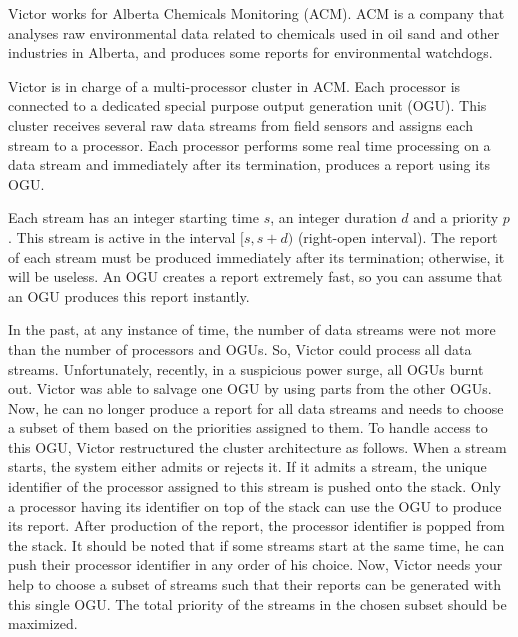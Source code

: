\newcommand{\maxstreams}{5000}
\newcommand{\maxsd}{10^9}
\newcommand{\maxpriority}{100,000}


\setlength{\columnsep}{15pt}
%
Victor works for Alberta Chemicals Monitoring (ACM). ACM is a company that analyses raw environmental data related to chemicals used in oil sand and other industries in Alberta, and produces some reports for environmental watchdogs. 

Victor is in charge of a multi-processor cluster in ACM. Each processor is connected to a dedicated special purpose output generation unit (OGU). This cluster receives several raw data streams from field sensors and assigns each stream to a processor. Each processor performs some real time processing on a data stream and immediately after its termination, produces a report using its OGU.

Each stream has an integer starting time $s$, an integer duration $d$ and a priority $p$. This stream is active in the interval $[s, s+d)$ (right-open interval). The report of each stream must be produced immediately after its termination; otherwise, it will be useless. An OGU creates a report extremely fast, so you can assume that an OGU produces this report instantly. 

In the past, at any instance of time, the number of data streams were not more than the number of processors and OGUs. So, Victor could process all data streams. Unfortunately, recently, in a suspicious power surge, all OGUs burnt out. Victor was able to salvage one OGU by using parts from the other OGUs. Now, he can no longer produce a report for all data streams and needs to choose a subset of them based on the priorities assigned to them. To handle access to this OGU, Victor restructured the cluster architecture as follows. When a stream starts, the system either admits or rejects it. If it admits a stream, the unique identifier of the processor assigned to this stream is pushed onto the stack. Only a processor having its identifier on top of the stack can use the OGU to produce its report. After production of the report, the processor identifier is popped from the stack. It should be noted that if some streams start at the same time, he can push their processor identifier in any order of his choice. Now, Victor needs your help to choose a subset of streams such that their reports can be generated with this single OGU.  The total priority of the streams in the chosen subset should be maximized.

